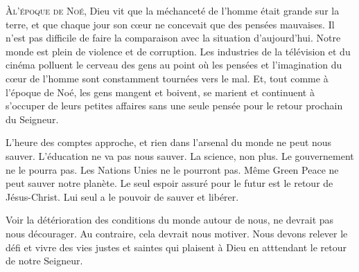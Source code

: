 

\lettrine{À}{l'époque de Noé,} Dieu vit que la méchanceté de l'homme
 était grande sur la terre, et que chaque jour son cœur ne concevait
 que des pensées mauvaises. Il n'est pas difficile de faire
 la comparaison avec la situation d'aujourd'hui. Notre monde est plein
 de violence et de corruption. Les industries de la télévision
 et du cinéma polluent le cerveau des gens au point où les pensées
 et l'imagination du cœur de l'homme sont constamment
 tournées vers le mal. Et, tout comme à l'époque de Noé,
 les gens mangent et boivent, se marient et continuent
 à s'occuper de leurs petites affaires sans une seule pensée
 pour le retour prochain du Seigneur. 


L'heure des comptes approche, et rien dans l'arsenal du monde
 ne peut nous sauver. L'éducation ne va pas nous sauver.
 La science, non plus. Le gouvernement ne le pourra pas.
 Les Nations Unies ne le pourront pas. Même Green Peace
 ne peut sauver notre planète. Le seul espoir assuré pour le futur
 est le retour de Jésus-Christ.
 Lui seul a le pouvoir de sauver et libérer. 

Voir la détérioration des conditions du monde autour de nous,
 ne devrait pas nous décourager. Au contraire, cela devrait nous motiver.
 Nous devons relever le défi et vivre des vies justes et saintes
 qui plaisent à Dieu en atttendant le retour de notre Seigneur. 

\dvrule






